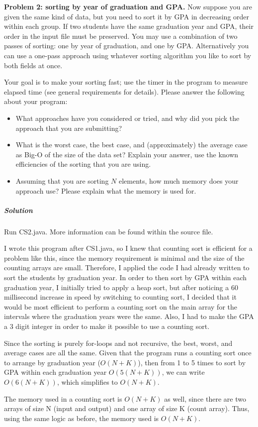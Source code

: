 \documentclass[a4paper]{amsart}
\newenvironment*{problem}{}{}
\begin{document}
	\begin{problem}
		\textbf{Problem 2: sorting by year of graduation and GPA.} Now suppose you are given the same kind of data, but you need to sort it by GPA in decreasing order within each group. If two students have the same graduation year and GPA, their order in the input file must be preserved. You may use a combination of two passes of sorting: one by year of graduation, and one by GPA. Alternatively you can use a one-pass approach using whatever sorting algorithm you like to sort by both fields at once.
		
		Your goal is to make your sorting fast; use the timer in the program to measure elapsed time (see general requirements for details). Please answer the following about your program:
		\begin{itemize}
			\item What approaches have you considered or tried, and why did you pick the approach that you are submitting?
			\item What is the worst case, the best case, and (approximately) the average case as Big-O of the size of the data set? Explain your answer, use the known efficiencies of the sorting that you are using.
			\item Assuming that you are sorting $N$ elements, how much memory does your approach use? Please explain what the memory is used for.
		\end{itemize}
		\subparagraph{\textbf{Solution}} Run CS2.java. More information can be found within the source file. 
		
		I wrote this program after CS1.java, so I knew that counting sort is efficient for a problem like this, since the memory requirement is minimal and the size of the counting arrays are small. Therefore, I applied the code I had already written to sort the students by graduation year. In order to then sort by GPA within each graduation year, I initially tried to apply a heap sort, but after noticing a 60 millisecond increase in speed by switching to counting sort, I decided that it would be most efficient to perform a counting sort on the main array for the intervals where the graduation years were the same. Also, I had to make the GPA a 3 digit integer in order to make it possible to use a counting sort. 
		
		Since the sorting is purely for-loops and not recursive, the best, worst, and average cases are all the same. Given that the program runs a counting sort once to arrange by graduation year ($O(N+K)$), then from 1 to 5 times to sort by GPA within each graduation year $O(5(N+K))$, we can write $O(6(N+K))$, which simplifies to $O(N+K)$.
		
		The memory used in a counting sort is $O(N+K)$ as well, since there are two arrays of size N (input and output) and one array of size K (count array). Thus, using the same logic as before, the memory used is $O(N+K)$.
	\end{problem}
\end{document}
